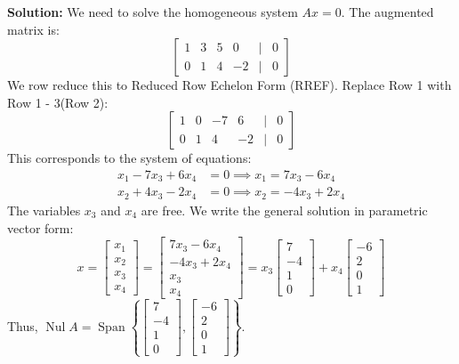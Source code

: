 \documentclass[11pt]{article}
\begin{document}
\textbf{Solution:}
We need to solve the homogeneous system $Ax = 0$. The augmented matrix is:
\[
\begin{bmatrix} 1 & 3 & 5 & 0 & \big| & 0 \\ 0 & 1 & 4 & -2 & \big| & 0 \end{bmatrix}
\]
We row reduce this to Reduced Row Echelon Form (RREF). Replace Row 1 with Row 1 - 3(Row 2):
\[
\begin{bmatrix} 1 & 0 & -7 & 6 & \big| & 0 \\ 0 & 1 & 4 & -2 & \big| & 0 \end{bmatrix}
\]
This corresponds to the system of equations:
\begin{align*}
x_1 - 7x_3 + 6x_4 &= 0 \implies x_1 = 7x_3 - 6x_4 \\
x_2 + 4x_3 - 2x_4 &= 0 \implies x_2 = -4x_3 + 2x_4
\end{align*}
The variables $x_3$ and $x_4$ are free. We write the general solution in parametric vector form:
\[
x = \begin{bmatrix} x_1 \\ x_2 \\ x_3 \\ x_4 \end{bmatrix} = \begin{bmatrix} 7x_3 - 6x_4 \\ -4x_3 + 2x_4 \\ x_3 \\ x_4 \end{bmatrix} = x_3 \begin{bmatrix} 7 \\ -4 \\ 1 \\ 0 \end{bmatrix} + x_4 \begin{bmatrix} -6 \\ 2 \\ 0 \\ 1 \end{bmatrix}
\]
Thus, $\operatorname{Nul} A = \operatorname{Span} \left\{ \begin{bmatrix} 7 \\ -4 \\ 1 \\ 0 \end{bmatrix}, \begin{bmatrix} -6 \\ 2 \\ 0 \\ 1 \end{bmatrix} \right\}$.
\end{document}
